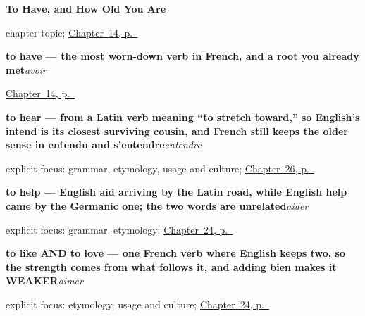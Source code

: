 \noindent\begin{minipage}[t]{\linewidth}
\raggedright
\textbf{To Have, and How Old You Are}\par
\footnotesize chapter topic; \hyperref[ch:avoir-age]{Chapter~14, p.~\pageref*{ch:avoir-age}}
\end{minipage}\par\smallskip

\noindent\begin{minipage}[t]{\linewidth}
\raggedright
\textbf{to have — the most worn-down verb in French, and a root you already met}\enspace\emph{avoir}\par
\footnotesize \hyperref[ch:avoir-age]{Chapter~14, p.~\pageref*{ch:avoir-age}}
\end{minipage}\par\smallskip

\noindent\begin{minipage}[t]{\linewidth}
\raggedright
\textbf{to hear — from a Latin verb meaning \textquotedblleft{}to stretch toward,\textquotedblright{} so English's intend is its closest surviving cousin, and French still keeps the older sense in entendu and s'entendre}\enspace\emph{entendre}\par
\footnotesize explicit focus: grammar, etymology, usage and culture; \hyperref[ch:fr-hearing-sleeping-walking-running]{Chapter~26, p.~\pageref*{ch:fr-hearing-sleeping-walking-running}}
\end{minipage}\par\smallskip

\noindent\begin{minipage}[t]{\linewidth}
\raggedright
\textbf{to help — English aid arriving by the Latin road, while English help came by the Germanic one; the two words are unrelated}\enspace\emph{aider}\par
\footnotesize explicit focus: grammar, etymology; \hyperref[ch:fr-taking-asking-helping-loving]{Chapter~24, p.~\pageref*{ch:fr-taking-asking-helping-loving}}
\end{minipage}\par\smallskip

\noindent\begin{minipage}[t]{\linewidth}
\raggedright
\textbf{to like AND to love — one French verb where English keeps two, so the strength comes from what follows it, and adding bien makes it WEAKER}\enspace\emph{aimer}\par
\footnotesize explicit focus: etymology, usage and culture; \hyperref[ch:fr-taking-asking-helping-loving]{Chapter~24, p.~\pageref*{ch:fr-taking-asking-helping-loving}}
\end{minipage}\par\smallskip

